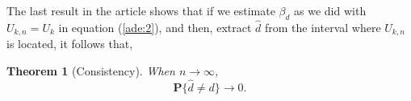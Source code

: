 \documentclass[12pt]{exam}
\def\P{\ensuremath{\mathbf{P}}}
\newtheorem{theorem}{Theorem}[section]
\theoremstyle{remark}
\begin{document}
The last result in the article shows that if we estimate $\beta_d$ as we did with $U_{k,n} = U_k$ in equation (\ref{ade:2}), and then, extract $\widehat{d}$ from the interval where $U_{k,n}$ is located, it follows that,
\begin{theorem}[Consistency] When $n\to \infty$,
  \[ \P\{\widehat{d} \neq d\} \to 0.\]
\end{theorem}
\end{document}
